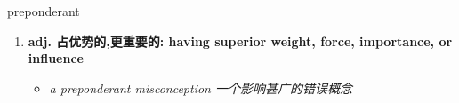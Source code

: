
\begin{frame}
{\huge preponderant}
\begin{center}
\begin{enumerate}\Large
  \item \textbf{adj. 占优势的,更重要的: having superior weight, force, importance, or influence}
  \begin{itemize}
    \item \em{\Large{a preponderant misconception 一个影响甚广的错误概念}}
  \end{itemize}
\end{enumerate}
\end{center}
\end{frame}
